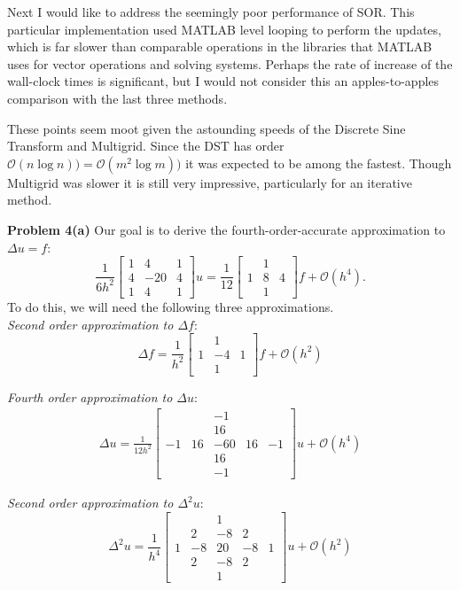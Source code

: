 \documentclass[12pt]{article}
\newcommand{\problem}[1]{\hspace{-4 ex} \large \textbf{Problem #1} }
\begin{document}
Next I would like to address the seemingly poor performance of SOR. This particular implementation used MATLAB level looping to perform the updates, which is far slower than comparable operations in the libraries that MATLAB uses for vector operations and solving systems. Perhaps the rate of increase of the wall-clock times is significant, but I would not consider this an apples-to-apples comparison with the last three methods. \bigbreak

These points seem moot given the astounding speeds of the Discrete Sine Transform and Multigrid. Since the DST has order $\mathcal{O}(n\log n)) = \mathcal{O}(m^2 \log m ))$ it was expected to be among the fastest. Though Multigrid was slower it is still very impressive, particularly for an iterative method.

\bigbreak
\problem{4(a)} Our goal is to derive the fourth-order-accurate approximation to $\Delta u = f$:
$$
\frac{1}{6h^2}\begin{bmatrix}1 & 4 & 1\\4 & -20&4\\1&4&1\end{bmatrix}u = \frac{1}{12}\begin{bmatrix} & 1 & \\1 & 8&4\\&1&\end{bmatrix}f + \mathcal{O}(h^4).
$$
To do this, we will need the following three approximations.\\
\textit{Second order approximation to $\Delta f$}:
$$
\Delta f = \frac{1}{h^2}\begin{bmatrix}&1&\\1&-4&1\\&1&\end{bmatrix}f + \mathcal{O}(h^2)
$$

\textit{Fourth order approximation to $\Delta u$}:
\begin{align}
\Delta u = \frac{1}{12h^2}\begin{bmatrix}&&-1&&\\&&16&&\\-1&16&-60&16&-1\\&&16&&\\&&-1&&\end{bmatrix}u + \mathcal{O}(h^4) \label{fourthOrder}
\end{align}

\textit{Second order approximation to $\Delta^2 u$}:
$$
\Delta^2 u = \frac{1}{h^4}\begin{bmatrix}&&1&&\\&2&-8&2&\\1&-8&20&-8&1\\&2&-8&2&\\&&1&&\end{bmatrix}u + \mathcal{O}(h^2)
$$
\end{document}
